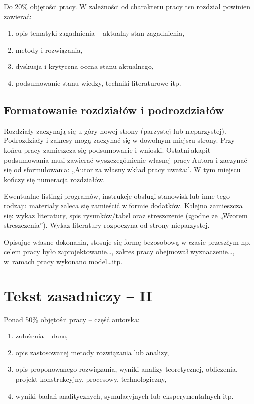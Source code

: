 \documentclass[12pt,twoside]{article}
\begin{document}
Do 20\% objętości pracy. W zależności od charakteru pracy ten rozdział powinien zawierać:
\begin{enumerate}[label=\alph*), leftmargin=1.25cm]
	\item opis tematyki zagadnienia -- aktualny stan zagadnienia,
	\item metody i rozwiązania,
	\item dyskusja i krytyczna ocena stanu aktualnego,
	\item podsumowanie stanu wiedzy, techniki literaturowe itp.
\end{enumerate}

\subsection{Formatowanie rozdziałów i podrozdziałów}
Rozdziały zaczynają się u góry nowej strony (parzystej lub nieparzystej). Podrozdziały i zakresy mogą zaczynać się w dowolnym miejscu strony. Przy końcu pracy zamieszcza się podsumowanie i wnioski. Ostatni akapit podsumowania musi zawierać wyszczególnienie własnej pracy Autora i zaczynać się od sformułowania: „Autor za własny wkład pracy uważa:”. W tym miejscu kończy się numeracja rozdziałów.

Ewentualne listingi programów, instrukcje obsługi stanowisk lub inne tego rodzaju materiały zaleca się zamieścić w formie dodatków. Kolejno zamieszcza się: wykaz literatury, spis rysunków/tabel oraz streszczenie (zgodne ze „Wzorem streszczenia”). Wykaz literatury rozpoczyna od strony nieparzystej.

Opisując własne dokonania, stosuje się formę bezosobową w czasie przeszłym np. celem pracy było zaprojektowanie\ldots, zakres pracy obejmował wyznaczenie\ldots, w~ramach pracy wykonano model\ldots itp.
\clearpage	

\section{Tekst zasadniczy -- II}

Ponad 50\% objętości pracy -- część autorska:
\begin{enumerate}[label=\alph*), leftmargin=1.25cm] 
	\item założenia – dane,
	\item opis zastosowanej metody rozwiązania lub analizy,
	\item opis proponowanego rozwiązania, wyniki analizy teoretycznej, obliczenia, projekt konstrukcyjny, procesowy, technologiczny,
	\item wyniki badań analitycznych, symulacyjnych lub eksperymentalnych itp.
\end{enumerate}
\end{document}

